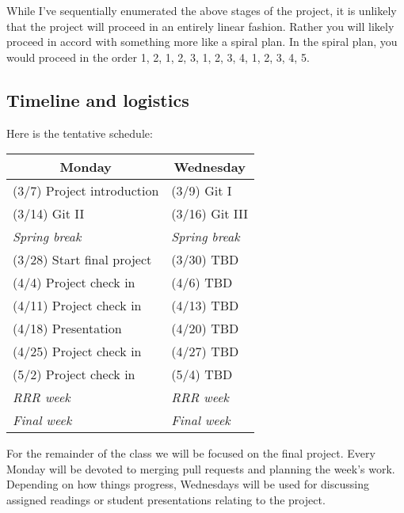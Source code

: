 \documentclass[11pt, oneside]{article}   	%
\begin{document}
While I've sequentially enumerated the above stages of the project, it is
unlikely that the project will proceed in an entirely linear fashion.  Rather
you will likely proceed in accord with something more like a spiral plan.  In
the spiral plan, you would proceed in the order 1, 2, 1, 2, 3, 1, 2, 3, 4, 1,
2, 3, 4, 5.

\subsection*{Timeline and logistics}

Here is the tentative schedule:

\begin{table}[h]
\centering
\begin{tabular}{@{}l|l@{}}
\toprule
\multicolumn{1}{c|}{Monday} & \multicolumn{1}{c}{Wednesday} \\
\hline
(3/7) Project introduction     & (3/9) Git I \\
(3/14) Git II                  & (3/16) Git III \\
\emph{\hspace{12mm} Spring break}  & \emph{\hspace{12mm} Spring break}\\
(3/28) Start final project     & (3/30) TBD\\
(4/4) Project check in         & (4/6) TBD\\
(4/11) Project check in        & (4/13) TBD\\
(4/18) Presentation            & (4/20) TBD\\
(4/25) Project check in        & (4/27) TBD\\
(5/2) Project check in         & (5/4) TBD\\
\emph{\hspace{12mm} RRR week}  & \emph{\hspace{12mm} RRR week}\\
\emph{\hspace{12mm} Final week}  & \emph{\hspace{12mm} Final week}\\
\bottomrule
\end{tabular}
\end{table}

For the remainder of the class we will be focused on the final project.  Every
Monday will be devoted to merging pull requests and planning the week's work.
Depending on how things progress, Wednesdays will be used for discussing
assigned readings or student presentations relating to the project.
\end{document}
